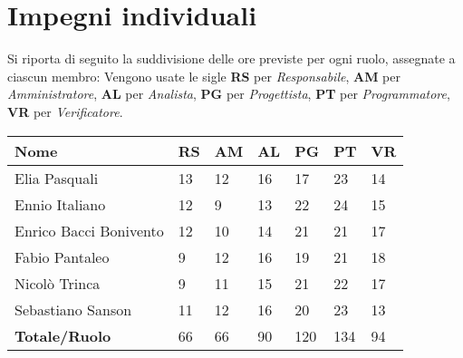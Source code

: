 \section{Impegni individuali}
Si riporta di seguito la suddivisione delle ore previste per ogni ruolo, assegnate a ciascun membro:
\smallskip
\noindent Vengono usate le sigle \textbf{RS} per \textit{Responsabile}, \textbf{AM} per \textit{Amministratore}, \textbf{AL} per \textit{Analista}, \textbf{PG} per \textit{Progettista}, \textbf{PT} per \textit{Programmatore}, \textbf{VR} per \textit{Verificatore}.

\begin{center}
    \begin{tabular}{|l|l|l|l|l|l|l|}
        \hline
        \textbf{Nome} & \textbf{RS} & \textbf{AM} & \textbf{AL} & \textbf{PG} & \textbf{PT} & \textbf{VR}\\
        \hline
        Elia Pasquali & 13 & 12 & 16 & 17 & 23 & 14  \\
        \hline
        Ennio Italiano& 12 & 9 & 13 & 22 & 24 & 15\\
        \hline
        Enrico Bacci Bonivento & 12 & 10 & 14 & 21 & 21 & 17 \\
        \hline
        Fabio Pantaleo & 9 & 12 & 16 & 19 & 21 & 18 \\
        \hline
        Nicolò Trinca & 9 & 11 & 15 & 21 & 22 & 17 \\
        \hline
        Sebastiano Sanson & 11 & 12 & 16 & 20 & 23 & 13 \\
        \hline
        \textbf{Totale/Ruolo} & 66 & 66 & 90 & 120 & 134 & 94 \\
        \hline
    \end{tabular}
\end{center}